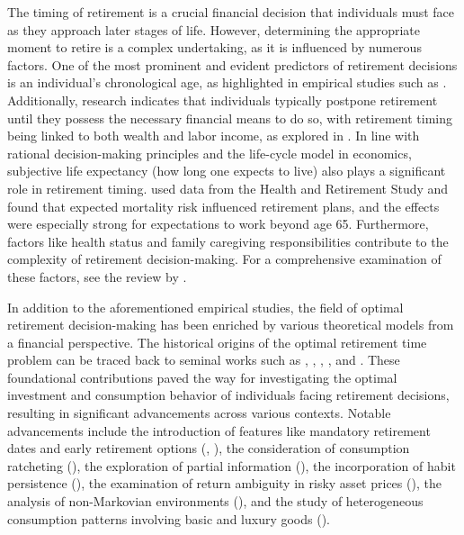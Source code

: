 \documentclass[a4paper,11pt]{amsart}
\numberwithin{equation}{section}
\begin{document}
The timing of retirement is a crucial financial decision that individuals must face as they approach later stages of life. However, determining the appropriate moment to retire is a complex undertaking, as it is influenced by numerous factors. One of the most prominent and evident predictors of retirement decisions is an individual's chronological age, as highlighted in empirical studies such as \citet{wang2014psychological}. Additionally, research indicates that individuals typically postpone retirement until they possess the necessary financial means to do so, with retirement timing being linked to both wealth and labor income, as explored in \citet{honig1998married}. In line with rational decision-making principles and the life-cycle model in economics, subjective life expectancy ({how long one expects to live}) also plays a significant role in retirement timing. \citet{szinovacz2014recession} used data from the Health and Retirement Study and found that expected mortality risk influenced retirement plans, and the effects were especially strong for expectations to work beyond age 65. Furthermore, factors like health status and {family} caregiving responsibilities contribute to the complexity of retirement decision-making. {For a comprehensive examination of these factors, see the review by \citet{fisher2016retirement}.}


In addition to the aforementioned empirical studies, the field of optimal retirement {decision-making} has been enriched by various theoretical models from a financial perspective. The historical origins of the optimal retirement time problem can be traced back to seminal works such as \citet{jin2006disutility}, \citet{farhi2007saving}, \citet{choi2008optimal}, \citet{dybvig2010lifetime}, and \citet{dybvig2011verification}. These foundational contributions paved the way for investigating the optimal investment and consumption behavior of individuals facing retirement decisions, resulting in significant advancements across various contexts. Notable advancements include the introduction of features like mandatory retirement dates and early retirement options (\citet{yang2018optimal}, \citet{jeon2023horizon}), the consideration of consumption ratcheting (\citet{jeon2020optimal}), the exploration of partial information (\citet{chen2021optimal}), the incorporation of habit persistence (\citet{chen2018optimal, he2022optimal, guan2025retirement}), the examination of return ambiguity in risky asset prices (\citet{park2023robust}), the analysis of non-Markovian environments (\citet{yang2021optimal}), and the study of heterogeneous consumption patterns involving basic and luxury goods (\citet{jang2024optimal}).
\end{document}
